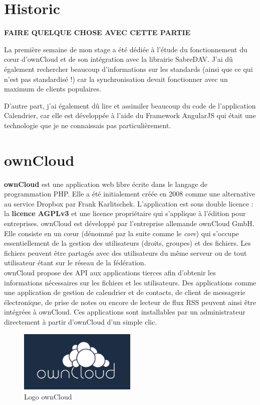 \documentclass[10pt,a4paper, twoside]{report}
\begin{document}
	\section{Historic}
	\textbf{\color{red}FAIRE QUELQUE CHOSE AVEC CETTE PARTIE}
	
	La première semaine de mon stage a été dédiée à l'étude du fonctionnement du cœur d'ownCloud et de son intégration avec la librairie SabreDAV. J'ai dû également rechercher beaucoup d'informations sur les standards (ainsi que ce qui n'est pas standardisé !) car la synchronisation devait fonctionner avec un maximum de clients populaires.
	
	D'autre part, j'ai également dû lire et assimiler beaucoup du code de l'application Calendrier, car elle est développée à l'aide du Framework AngularJS qui était une technologie que je ne connaissais pas particulièrement.
	
	\section{ownCloud}
	\textbf{ownCloud} est une application web libre écrite dans le langage de programmation PHP. Elle a été initialement créée en 2008 comme une alternative au service Dropbox par Frank Karlitschek. L'application est sous double licence : la \textbf{licence AGPLv3} et une licence propriétaire qui s'applique à l'édition pour entreprises. ownCloud est développé par l'entreprise allemande ownCloud GmbH.
	\\
	
	Elle consiste en un cœur (dénommé par la suite comme le \textit{core}) qui s'occupe essentiellement de la gestion des utilisateurs (droits, groupes) et des fichiers. Les fichiers peuvent être partagés avec des utilisateurs du même serveur ou de tout utilisateur étant sur le réseau de la fédération.
	\\
	
	ownCloud propose des API aux applications tierces afin d'obtenir les informations nécessaires sur les fichiers et les utilisateurs. Des applications comme une application de gestion de calendrier et de contacts, de client de messagerie électronique, de prise de notes ou encore de lecteur de flux RSS peuvent ainsi être intégrées à ownCloud.
	Ces applications sont installables par un administrateur directement à partir d'ownCloud d'un simple clic.
	
	\begin{figure}[ht]
		\centering
		\includegraphics[width=0.5\textwidth]{images/owncloud-logo.png}
		\caption*{Logo ownCloud}
		\label{normal_case}
	\end{figure}
	
\end{document}
